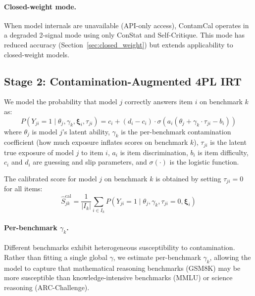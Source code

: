 \documentclass[letterpaper]{article}
\begin{document}
\paragraph{Closed-weight mode.}
When model internals are unavailable (API-only access), ContamCal operates in a degraded 2-signal mode using only ConStat and Self-Critique.
This mode has reduced accuracy (Section~\ref{sec:closed_weight}) but extends applicability to closed-weight models.

\subsection{Stage 2: Contamination-Augmented 4PL IRT}
\label{sec:stage2}

We model the probability that model $j$ correctly answers item $i$ on benchmark $k$ as:
\begin{equation}
P(Y_{ji} = 1 \mid \theta_j, \gamma_k, \boldsymbol{\xi}_i, \tau_{ji}) = c_i + (d_i - c_i) \cdot \sigma\!\left(a_i(\theta_j + \gamma_k \cdot \tau_{ji} - b_i)\right)
\label{eq:4pl}
\end{equation}
where $\theta_j$ is model $j$'s latent ability, $\gamma_k$ is the per-benchmark contamination coefficient (how much exposure inflates scores on benchmark $k$), $\tau_{ji}$ is the latent true exposure of model $j$ to item $i$, $a_i$ is item discrimination, $b_i$ is item difficulty, $c_i$ and $d_i$ are guessing and slip parameters, and $\sigma(\cdot)$ is the logistic function.

The calibrated score for model $j$ on benchmark $k$ is obtained by setting $\tau_{ji} = 0$ for all items:
\begin{equation}
\hat{S}^{\text{cal}}_{jk} = \frac{1}{|I_k|}\sum_{i \in I_k} P(Y_{ji} = 1 \mid \theta_j, \gamma_k, \tau_{ji}{=}0, \boldsymbol{\xi}_i)
\end{equation}

\paragraph{Per-benchmark $\gamma_k$.}
Different benchmarks exhibit heterogeneous susceptibility to contamination.
Rather than fitting a single global $\gamma$, we estimate per-benchmark $\gamma_k$, allowing the model to capture that mathematical reasoning benchmarks (GSM8K) may be more susceptible than knowledge-intensive benchmarks (MMLU) or science reasoning (ARC-Challenge).
\end{document}
